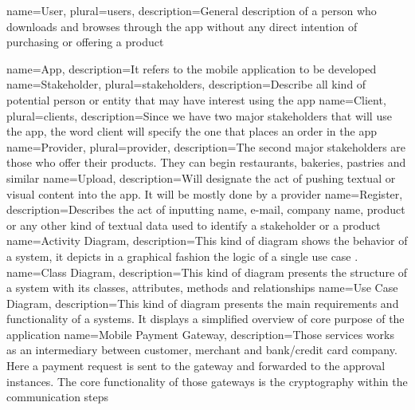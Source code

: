 
\makeglossaries


 {
    name={User},
    plural={users},
    description={General description of a person who downloads and browses through the app without any direct intention
    of purchasing or offering a product}
}

 {
    name={App},
    description={It refers to the mobile application to be developed}
}
 {
    name={Stakeholder},
    plural={stakeholders},
    description={Describe all kind of potential person or entity that may have interest using the app}
}
 {
    name={Client},
    plural={clients},
    description={Since we have two major stakeholders that will use the app, the word client will
    specify the one that places an order in the app}
}
 {
    name={Provider},
    plural={provider},
    description={The second major stakeholders are those who offer their products. They can begin
                restaurants, bakeries, pastries and similar}
}
 {
    name={Upload},
    description={Will designate the act of pushing textual or visual content into the app. It will
                be mostly done by a provider}
}
 {
    name={Register},
    description={Describes the act of inputting name, e-mail, company name, product or any other kind of
    textual data used to identify a stakeholder or a product}
}
 {
    name={Activity Diagram},
    description={This kind of diagram shows the behavior of a system, it depicts in a graphical fashion 
    the logic of a single use case \cite{refinbook:Baresi2009}.}
}
 {
    name={Class Diagram},
    description={This kind of diagram presents the structure of a system with its classes, attributes,
    methods and relationships\cite{refonline:IBMCD}}
}
 {
    name={Use Case Diagram},
    description={This kind of diagram presents the main requirements and functionality of a systems. It displays
    a simplified overview of core purpose of the application \cite{refart:YWRUS}}
}
 {
    name={Mobile Payment Gateway},
    description={Those services works as an intermediary between customer, merchant and bank/credit card company. 
    Here a payment request is sent to the gateway and forwarded to the approval instances. The core functionality 
    of those gateways is the cryptography within the communication steps\cite{refonline:VPGI}}
}

